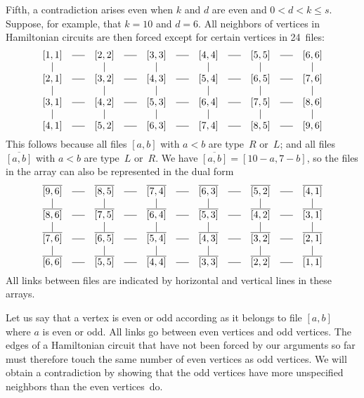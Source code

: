 Fifth, a contradiction arises even when $k$ and $d$ are even and $0<d<k\leq s$.
Suppose, for example, that $k=10$ and $d=6$. All neighbors of vertices in
Hamiltonian circuits are then forced except for certain vertices in 24~files:
$$\vcenter{\halign{%
$\hfil#\hfil$\quad%
&$\hfil#\hfil$\quad%
&$\hfil#\hfil$\quad&$\hfil#\hfil$\quad&$\hfil#\hfil$\quad&$\hfil#\hfil$\quad%
&$\hfil#\hfil$\quad&$\hfil#\hfil$\quad&$\hfil#\hfil$\quad&$\hfil#\hfil$\quad%
&$\hfil#\hfil$\cr
[1,1]&\longdash&[2,2]&\longdash&[3,3]&\longdash&[4,4]&\longdash%
&[5,5]&\longdash&[6,6]\cr
\vert&&\vert&&\vert&&\vert&&\vert&&\vert\cr
[2,1]&\longdash&[3,2]&\longdash&[4,3]&\longdash&[5,4]&\longdash&[6,5]%
&\longdash&[7,6]\cr
\vert&&\vert&&\vert&&\vert&&\vert&&\vert\cr
[3,1]&\longdash&[4,2]&\longdash&[5,3]&\longdash%
&[6,4]&\longdash&[7,5]&\longdash&[8,6]\cr
\vert&&\vert&&\vert&&\vert&&\vert&&\vert\cr
[4,1]&\longdash&[5,2]&\longdash&[6,3]&\longdash%
&[7,4]&\longdash&[8,5]&\longdash&[9,6]\cr}}$$
This follows because all files $[a,b]$ with $a<b$ are type~$R$ or~$L$; and all
files $\overline{[a,b]}$ with $a<b$ are type~$L$ or~$R$. We have
$\overline{[a,b]}=[10-a,7-b]$, so the files in the array can also be
represented in the dual form
$$\vcenter{\halign{%
$\hfil#\hfil$\quad%
&$\hfil#\hfil$\quad%
&$\hfil#\hfil$\quad&$\hfil#\hfil$\quad&$\hfil#\hfil$\quad&$\hfil#\hfil$\quad%
&$\hfil#\hfil$\quad&$\hfil#\hfil$\quad&$\hfil#\hfil$\quad&$\hfil#\hfil$\quad%
&$\hfil#\hfil$\cr
\overline{[9,6]}&\longdash&\overline{[8,5]}&\longdash&\overline{[7,4]}%
&\longdash&\overline{[6,3]}&\longdash%
&\overline{[5,2]}&\longdash&\overline{[4,1]}\cr
\vert&&\vert&&\vert&&\vert&&\vert&&\vert\cr
\overline{[8,6]}&\longdash&\overline{[7,5]}&\longdash&\overline{[6,4]}%
&\longdash&\overline{[5,3]}&\longdash%
&\overline{[4,2]}&\longdash&\overline{[3,1]}\cr
\vert&&\vert&&\vert&&\vert&&\vert&&\vert\cr
\overline{[7,6]}&\longdash&\overline{[6,5]}&\longdash&\overline{[5,4]}%
&\longdash&\overline{[4,3]}&\longdash&\overline{[3,2]}%
&\longdash&\overline{[2,1]}\cr
\vert&&\vert&&\vert&&\vert&&\vert&&\vert\cr
\overline{[6,6]}&\longdash&\overline{[5,5]}&\longdash&\overline{[4,4]}%
&\longdash&\overline{[3,3]}&\longdash&\overline{[2,2]}%
&\longdash&\overline{[1,1]}\cr}}$$
All links between files are indicated by horizontal and vertical lines in these
arrays.

Let us say that a vertex is even or odd according as it belongs to file $[a,b]$
where $a$ is even or odd. All links go between even vertices and odd vertices.
The edges of a Hamiltonian circuit that have not been forced by our arguments
so far must therefore touch the same number of even vertices as odd vertices.
We will obtain a contradiction by showing that the odd vertices have more
unspecified neighbors than the even vertices~do.

